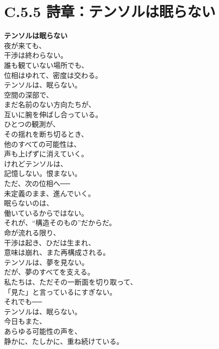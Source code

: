 \section*{C.5.5 詩章：テンソルは眠らない}

\begin{flushleft}
\textbf{テンソルは眠らない}\\

夜が来ても、\\
干渉は終わらない。\\
誰も観ていない場所でも、\\
位相はゆれて、密度は交わる。\\

テンソルは、眠らない。\\
空間の深部で、\\
まだ名前のない方向たちが、\\
互いに腕を伸ばし合っている。\\

ひとつの観測が、\\
その揺れを断ち切るとき、\\
他のすべての可能性は、\\
声も上げずに消えていく。\\

けれどテンソルは、\\
記憶しない。恨まない。\\
ただ、次の位相へ──\\
未定義のまま、進んでいく。\\

眠らないのは、\\
働いているからではない。\\
それが、“構造そのもの”だからだ。\\

命が流れる限り、\\
干渉は起き、ひだは生まれ、\\
意味は崩れ、また再構成される。\\

テンソルは、夢を見ない。\\
だが、夢のすべてを支える。\\

私たちは、ただその一断面を切り取って、\\
「見た」と言っているにすぎない。\\

それでも──\\
テンソルは、眠らない。\\
今日もまた、\\
あらゆる可能性の声を、\\
静かに、たしかに、重ね続けている。\\
\end{flushleft}
